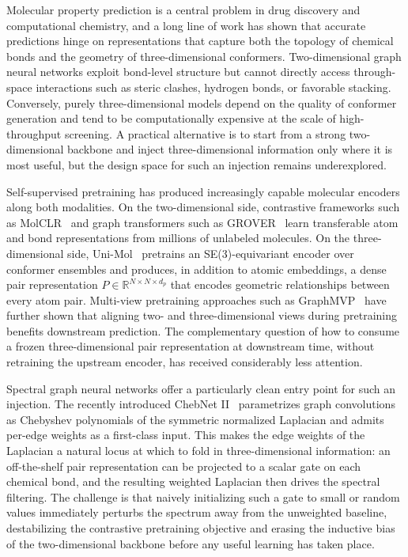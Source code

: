 \documentclass[conference]{IEEEtran}
\begin{document}
Molecular property prediction is a central problem in drug discovery and computational chemistry, and a long line of work has shown that accurate predictions hinge on representations that capture both the topology of chemical bonds and the geometry of three-dimensional conformers. Two-dimensional graph neural networks exploit bond-level structure but cannot directly access through-space interactions such as steric clashes, hydrogen bonds, or favorable stacking. Conversely, purely three-dimensional models depend on the quality of conformer generation and tend to be computationally expensive at the scale of high-throughput screening. A practical alternative is to start from a strong two-dimensional backbone and inject three-dimensional information only where it is most useful, but the design space for such an injection remains underexplored.

Self-supervised pretraining has produced increasingly capable molecular encoders along both modalities. On the two-dimensional side, contrastive frameworks such as MolCLR~\cite{wang2022molclr} and graph transformers such as GROVER~\cite{rong2020grover} learn transferable atom and bond representations from millions of unlabeled molecules. On the three-dimensional side, Uni-Mol~\cite{zhou2023unimol} pretrains an SE(3)-equivariant encoder over conformer ensembles and produces, in addition to atomic embeddings, a dense pair representation $P \in \mathbb{R}^{N \times N \times d_p}$ that encodes geometric relationships between every atom pair. Multi-view pretraining approaches such as GraphMVP~\cite{liu2022graphmvp} have further shown that aligning two- and three-dimensional views during pretraining benefits downstream prediction. The complementary question of how to consume a frozen three-dimensional pair representation at downstream time, without retraining the upstream encoder, has received considerably less attention.

Spectral graph neural networks offer a particularly clean entry point for such an injection. The recently introduced ChebNet II~\cite{he2022chebnetii} parametrizes graph convolutions as Chebyshev polynomials of the symmetric normalized Laplacian and admits per-edge weights as a first-class input. This makes the edge weights of the Laplacian a natural locus at which to fold in three-dimensional information: an off-the-shelf pair representation can be projected to a scalar gate on each chemical bond, and the resulting weighted Laplacian then drives the spectral filtering. The challenge is that naively initializing such a gate to small or random values immediately perturbs the spectrum away from the unweighted baseline, destabilizing the contrastive pretraining objective and erasing the inductive bias of the two-dimensional backbone before any useful learning has taken place.
\end{document}
